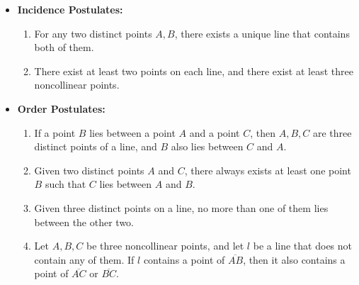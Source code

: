 \begin{itemize}
\item \textbf{Incidence Postulates:}
\begin{enumerate}
\item[(a)] For any two distinct points $A, B$, there exists a unique line that contains both of them.
\item[(b)] There exist at least two points on each line, and there exist at least three noncollinear points.
\end{enumerate}

\item \textbf{Order Postulates:}
\begin{enumerate}
\item[(a)] If a point $B$ lies between a point $A$ and a point $C$, then $A, B, C$ are three distinct points of a line, and $B$ also lies between $C$ and $A$.
\item[(b)] Given two distinct points $A$ and $C$, there always exists at least one point $B$ such that $C$ lies between $A$ and $B$.
\item[(c)] Given three distinct points on a line, no more than one of them lies between the other two.
\item[(d)] Let $A, B, C$ be three noncollinear points, and let $l$ be a line that does not contain any of them. If $l$ contains a point of $\overline{AB}$, then it also contains a point of $\overline{AC}$ or $\overline{BC}$.
\end{enumerate}


\end{itemize}
